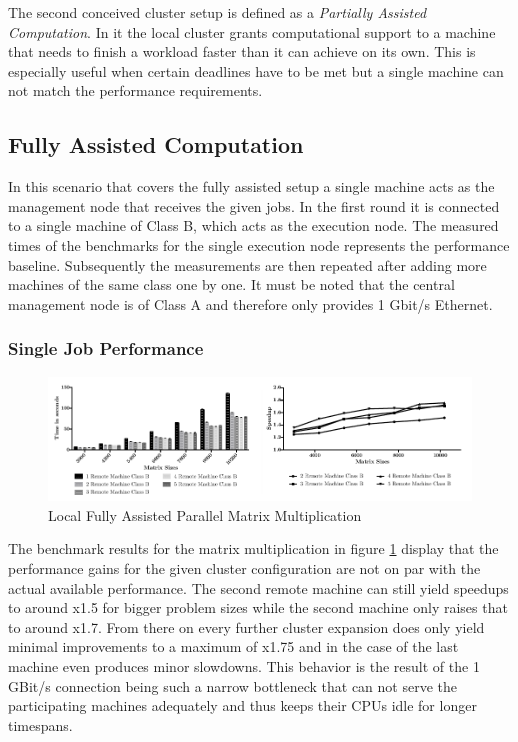 The second conceived cluster setup is defined as a \textit{Partially Assisted Computation}. In it the local cluster grants computational support to a machine that needs to finish a workload faster than it can achieve on its own. This is especially useful when certain deadlines have to be met but a single machine can not match the performance requirements.
\subsection{Fully Assisted Computation}
In this scenario that covers the fully assisted setup a single machine acts as the management node that receives the given jobs. In the first round it is connected to a single machine of Class B, which acts as the execution node. The measured times of the benchmarks for the single execution node represents the performance baseline. Subsequently the measurements are then repeated after adding more machines of the same class one by one. It must be noted that the central management node is of Class A and therefore only provides 1 Gbit/s Ethernet.

\subsubsection*{Single Job Performance}

\begin{figure}[H]
	
	\includegraphics[width=1.0\textwidth]{images/local_fully_assisted_matrix.pdf}
	\centering
	\caption{Local Fully Assisted Parallel Matrix Multiplication}
	\label{img:fully_assisted_parallel_matrix}
\end{figure}

The benchmark results for the matrix multiplication in figure \ref{img:fully_assisted_parallel_matrix} display that the performance gains for the given cluster configuration are not on par with the actual available performance. The second remote machine can still yield speedups to around x1.5 for bigger problem sizes while the second machine only raises that to around x1.7. From there on every further cluster expansion does only yield minimal improvements to a maximum of x1.75 and in the case of the last machine even produces minor slowdowns. This behavior is the result of the 1 GBit/s connection being such a narrow bottleneck that can not serve the participating machines adequately and thus keeps their CPUs idle for longer timespans.  

